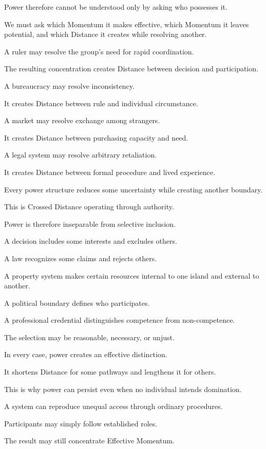 Power therefore cannot be understood only by asking who possesses it.

We must ask which Momentum it makes effective, which Momentum it leaves potential, and which Distance it creates while resolving another.

A ruler may resolve the group’s need for rapid coordination.

The resulting concentration creates Distance between decision and participation.

A bureaucracy may resolve inconsistency.

It creates Distance between rule and individual circumstance.

A market may resolve exchange among strangers.

It creates Distance between purchasing capacity and need.

A legal system may resolve arbitrary retaliation.

It creates Distance between formal procedure and lived experience.

Every power structure reduces some uncertainty while creating another boundary.

This is Crossed Distance operating through authority.

Power is therefore inseparable from selective inclusion.

A decision includes some interests and excludes others.

A law recognizes some claims and rejects others.

A property system makes certain resources internal to one island and external to another.

A political boundary defines who participates.

A professional credential distinguishes competence from non-competence.

The selection may be reasonable, necessary, or unjust.

In every case, power creates an effective distinction.

It shortens Distance for some pathways and lengthens it for others.

This is why power can persist even when no individual intends domination.

A system can reproduce unequal access through ordinary procedures.

Participants may simply follow established roles.

The result may still concentrate Effective Momentum.

